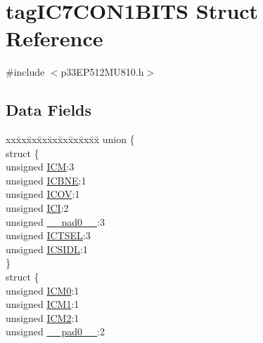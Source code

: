\hypertarget{structtag_i_c7_c_o_n1_b_i_t_s}{}\section{tag\+I\+C7\+C\+O\+N1\+B\+I\+TS Struct Reference}
\label{structtag_i_c7_c_o_n1_b_i_t_s}


{\ttfamily \#include $<$p33\+E\+P512\+M\+U810.\+h$>$}

\subsection*{Data Fields}
\begin{DoxyCompactItemize}
\item 
\begin{tabbing}
xx\=xx\=xx\=xx\=xx\=xx\=xx\=xx\=xx\=\kill
union \{\\
\>struct \{\\
\>\>unsigned \hyperlink{structtag_i_c7_c_o_n1_b_i_t_s_ad3edde44ecb2d349ffa2decd0a251c20}{ICM}:3\\
\>\>unsigned \hyperlink{structtag_i_c7_c_o_n1_b_i_t_s_a824e7dcca83939e1b049d63ffcee33e9}{ICBNE}:1\\
\>\>unsigned \hyperlink{structtag_i_c7_c_o_n1_b_i_t_s_a49392949376ba0bf58cf8db889e86c94}{ICOV}:1\\
\>\>unsigned \hyperlink{structtag_i_c7_c_o_n1_b_i_t_s_a72486dcb868aad2d5c978494691356cc}{ICI}:2\\
\>\>unsigned \hyperlink{structtag_i_c7_c_o_n1_b_i_t_s_adf71f3d8410c1f1dbbc96680a92c49af}{\_\_pad0\_\_}:3\\
\>\>unsigned \hyperlink{structtag_i_c7_c_o_n1_b_i_t_s_a7a9dd41b5f93eb620df7fa336e452677}{ICTSEL}:3\\
\>\>unsigned \hyperlink{structtag_i_c7_c_o_n1_b_i_t_s_af441b36127c0bb7a35162dfc9a64103c}{ICSIDL}:1\\
\>\} \\
\>struct \{\\
\>\>unsigned \hyperlink{structtag_i_c7_c_o_n1_b_i_t_s_a649b1dd9bca75e558f37a9f52a829bd4}{ICM0}:1\\
\>\>unsigned \hyperlink{structtag_i_c7_c_o_n1_b_i_t_s_af3fe77ef9f8ca41ff11519f445e7bc77}{ICM1}:1\\
\>\>unsigned \hyperlink{structtag_i_c7_c_o_n1_b_i_t_s_a3c62c9cbbc3a406402126c932b709db8}{ICM2}:1\\
\>\>unsigned \hyperlink{structtag_i_c7_c_o_n1_b_i_t_s_adf71f3d8410c1f1dbbc96680a92c49af}{\_\_pad0\_\_}:2\\

\end{tabbing}
\end{DoxyCompactItemize}
